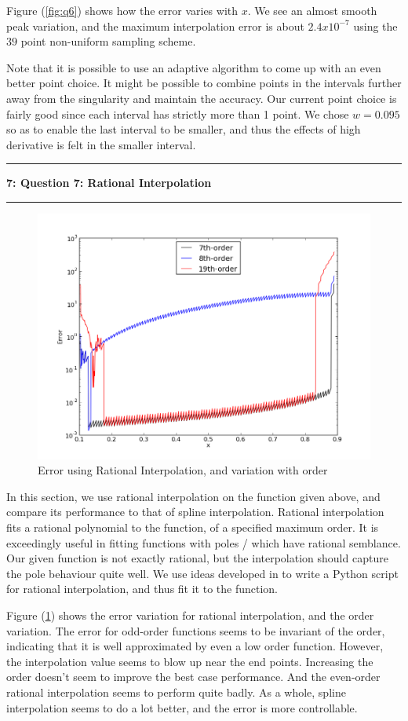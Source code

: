 \documentclass[11pt]{article}
\newcommand\question[2]{\vspace{.25in}\hrule\textbf{#1: #2}\vspace{.5em}\hrule\vspace{.10in}}
\begin{document}
Figure (\ref{fig:q6}) shows how the error varies with $x$. We see an almost smooth peak variation, and the maximum interpolation error is about $2.4x10^{-7}$ using the $39$ point non-uniform sampling scheme. 

Note that it is possible to use an adaptive algorithm to come up with an even better point choice. It might be possible to combine points in the intervals further away from the singularity and maintain the accuracy. Our current point choice is fairly good since each interval has strictly more than 1 point. We chose $w=0.095$ so as to enable the last interval to be smaller, and thus the effects of high derivative is felt in the smaller interval. 

\question{7}{Question 7: Rational Interpolation } 
\setcounter{section}{7}
 
\begin{figure}
\centering
\includegraphics[width=0.6\linewidth]{q7/err_comp.png}
\caption{Error using Rational Interpolation, and variation with order}
\label{fig:q7}
\end{figure}

In this section, we use rational interpolation on the function given above, and compare its performance to that of spline interpolation. Rational interpolation fits a rational polynomial to the function, of a specified maximum order. It is exceedingly useful in fitting functions with poles / which have rational semblance. Our given function is not exactly rational, but the interpolation should capture the pole behaviour quite well. We use ideas developed in \cite{NR}
 to write a Python script for rational interpolation, and thus fit it to the function. 

Figure (\ref{fig:q7}) shows the error variation for rational interpolation, and the order variation. The error for odd-order functions seems to be invariant of the order, indicating that it is well approximated by even a low order function. However, the interpolation value seems to blow up near the end points. Increasing the order doesn't seem to improve the best case performance. And the even-order rational interpolation seems to perform quite badly. As a whole, spline interpolation seems to do a lot better, and the error is more controllable. 
\end{document}
